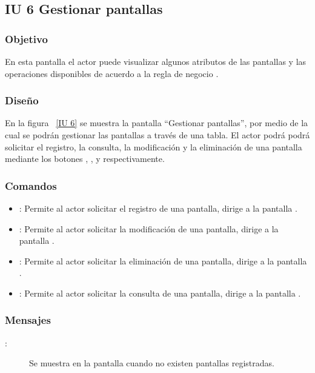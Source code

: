 \newpage 
\subsection{IU 6 Gestionar pantallas}
\subsubsection{Objetivo}
	
	En esta pantalla el actor puede visualizar algunos atributos de las pantallas y las operaciones disponibles de acuerdo a la regla de negocio .

\subsubsection{Diseño}

    En la figura ~\ref{IU 6} se muestra la pantalla ``Gestionar pantallas'', por medio de la cual 
    se podrán gestionar las pantallas a través de una tabla.
    El actor podrá podrá solicitar el registro, la consulta, la modificación y la eliminación de una pantalla mediante los botones
    , \btnConsulta, \btnEditar y \btnEliminar respectivamente. \\




\subsubsection{Comandos}
\begin{itemize}
	\item {}: Permite al actor solicitar el registro de una pantalla, dirige a la pantalla .
	\item \btnEditar[Modificar]: Permite al actor solicitar la modificación de una pantalla, dirige a la pantalla .
	\item \btnEliminar[Eliminar]: Permite al actor solicitar la eliminación de una pantalla, dirige a la pantalla .
	\item \btnConsulta[Consultar]: Permite al actor solicitar la consulta de una pantalla, dirige a la pantalla .
\end{itemize}

\subsubsection{Mensajes}

	
\begin{description}
	\item[:] Se muestra en la pantalla  cuando no existen pantallas registradas.
\end{description}
